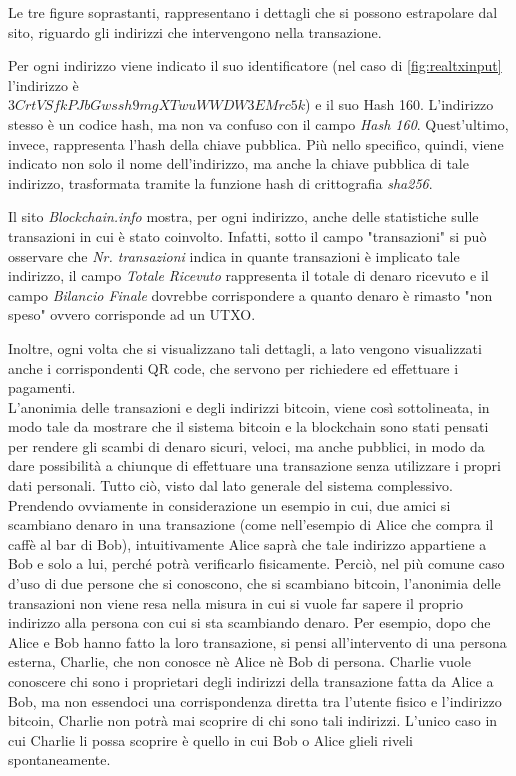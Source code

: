 Le tre figure soprastanti, rappresentano i dettagli che si possono estrapolare dal sito, riguardo gli indirizzi che intervengono nella transazione. 

Per ogni indirizzo viene indicato il suo identificatore (nel caso di \ref{fig:realtxinput} l'indirizzo è \\ $3CrtVSfkPJbGwssh9mgXTwuWWDW3EMrc5k$) e il suo Hash 160. L'indirizzo stesso è un codice hash, ma non va confuso con il campo \textit{Hash 160}. Quest'ultimo, invece, rappresenta l'hash della chiave pubblica. Più nello specifico, quindi, viene indicato non solo il nome dell'indirizzo, ma anche la chiave pubblica di tale indirizzo, trasformata tramite la funzione hash di crittografia \textit{sha256}.

Il sito \textit{Blockchain.info} mostra, per ogni indirizzo, anche delle statistiche sulle transazioni in cui è stato coinvolto. Infatti, sotto il campo "transazioni" si può osservare che \textit{Nr. transazioni} indica in quante transazioni è implicato tale indirizzo, il campo \textit{Totale Ricevuto} rappresenta il totale di denaro ricevuto e il campo \textit{Bilancio Finale} dovrebbe corrispondere a quanto denaro è rimasto "non speso" ovvero corrisponde ad un UTXO.

Inoltre, ogni volta che si visualizzano tali dettagli, a lato vengono visualizzati anche i corrispondenti QR code, che servono per richiedere ed effettuare i pagamenti.\\

L'anonimia delle transazioni e degli indirizzi bitcoin, viene così sottolineata, in modo tale da mostrare che il sistema bitcoin e la blockchain sono stati pensati per rendere gli scambi di denaro sicuri, veloci, ma anche pubblici, in modo da dare possibilità a chiunque di effettuare una transazione senza utilizzare i propri dati personali. Tutto ciò, visto dal lato generale del sistema complessivo. Prendendo ovviamente in considerazione un esempio in cui, due amici si scambiano denaro in una transazione (come nell'esempio di Alice che compra il caffè al bar di Bob), intuitivamente Alice saprà che tale indirizzo appartiene a Bob e solo a lui, perché potrà verificarlo fisicamente. Perciò, nel più comune caso d'uso di due persone che si conoscono, che si scambiano bitcoin, l'anonimia delle transazioni non viene resa nella misura in cui si vuole far sapere il proprio indirizzo alla persona con cui si sta scambiando denaro. Per esempio, dopo che Alice e Bob hanno fatto la loro transazione, si pensi all'intervento di una persona esterna, Charlie, che non conosce nè Alice nè Bob di persona. Charlie vuole conoscere chi sono i proprietari degli indirizzi della transazione fatta da Alice a Bob, ma non essendoci una corrispondenza diretta tra l'utente fisico e l'indirizzo bitcoin, Charlie non potrà mai scoprire di chi sono tali indirizzi. L'unico caso in cui Charlie li possa scoprire è quello in cui Bob o Alice glieli riveli spontaneamente.

